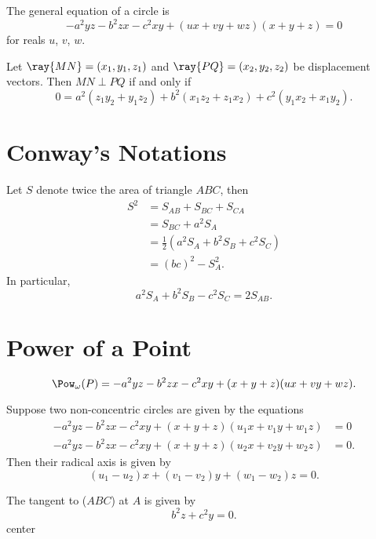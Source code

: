 \documentclass[11pt]{scrartcl}
\begin{document}
\begin{theorem}
  The general equation of a circle is
  \[-a^2yz-b^2zx-c^2xy+(ux+vy+wz)(x+y+z)=0\]
  for reals $u$, $v$, $w$.
\end{theorem}

\begin{theorem}
  Let $\ray{MN} = (x_1, y_1, z_1)$ and $\ray{PQ} = 
(x_2, y_2, z_2)$ be displacement vectors. Then $MN \perp PQ$ if and only if
\[0 = a^2(z_1y_2 + y_1z_2) + b^2(x_1z_2 + z_1x_2) + c^2(y_1x_2 + x_1y_2).\]
\end{theorem}

\section{Conway's Notations}
\begin{proposition}
  Let $S$ denote twice the area of triangle $ABC$, then
  \begin{align*}
    S^2 &= S_{AB} + S_{BC} + S_{CA}\\
        &= S_{BC} + a^2S_A\\
        &= \frac{1}{2}(a^2S_A + b^2S_B + c^2S_C)\\
        &= (bc)^2 - S_A^2.
  \end{align*}
  In particular,
  \[a^2S_A + b^2S_B - c^2S_C = 2S_{AB}.\]
\end{proposition}
\section{Power of a Point}
\begin{lemma}
  \[\Pow_\omega(P) = - a^2yz - b^2zx - c^2xy + (x + y + z)(ux + vy + wz).\]
\end{lemma}

\begin{lemma}
  Suppose two non-concentric circles are given by the equations
  \begin{align*}
    - a^2yz - b^2zx - c^2xy + (x + y + z)(u_1x + v_1y + w_1z) &= 0\\
    - a^2yz - b^2zx - c^2xy + (x + y + z)(u_2x + v_2y + w_2z) &= 0.
  \end{align*}
  Then their radical axis is given by
  \[(u_1 - u_2)x + (v_1 - v_2)y + (w_1 - w_2)z = 0.\]
\end{lemma}
\begin{lemma}
  The tangent to ($ABC$) at $A$ is given by
  \[b^2z + c^2y = 0.\]
  center
\end{lemma}
\end{document}
